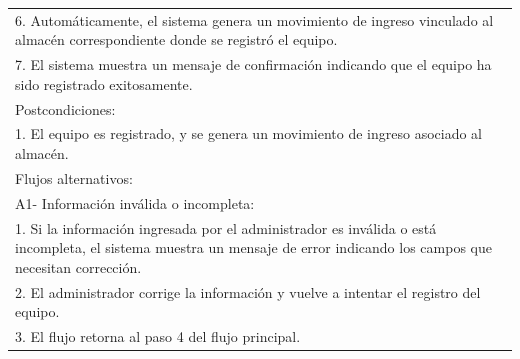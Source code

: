 \documentclass[stu, 12pt, letterpaper, donotrepeattitle, floatsintext, natbib]{apa7}
\begin{document}
\begin{longtable}{@{} p{16.5cm} @{}}
    6. Automáticamente, el sistema genera un movimiento de ingreso vinculado al almacén correspondiente donde se registró el equipo.                                                                                                                                           \\
    7. El sistema muestra un mensaje de confirmación indicando que el equipo ha sido registrado exitosamente.                                                                                                                                                                  \\ \midrule
    Postcondiciones:                                                                                                                                                                                                                                                           \\
    1. El equipo es registrado, y se genera un movimiento de ingreso asociado al almacén.                                                                                                                                                                                      \\ \midrule
    Flujos alternativos:                                                                                                                                                                                                                                                       \\
    A1- Información inválida o incompleta:                                                                                                                                                                                                                                     \\
    \hspace{1cm}1. Si la información ingresada por el administrador es inválida o está incompleta, el sistema muestra un mensaje de error indicando los campos que necesitan corrección.                                                                                       \\
    \hspace{1cm}2. El administrador corrige la información y vuelve a intentar el registro del equipo.                                                                                                                                                                         \\
    \hspace{1cm}3. El flujo retorna al paso 4 del flujo principal.                                                                                                                                                                                                             \\ \bottomrule
\end{longtable}
\end{document}
